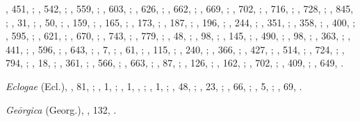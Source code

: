 \begin{autindex}
    , 451, ;
    , 542, ;
    , 559, ;
    , 603, ;
    , 626, ;
    , 662, ;
    , 669, ;
    , 702, ;
    , 716, ;
    , 728, ;
    , 845, ;
    ,  31, ;
    ,  50, ;
    , 159, ;
    , 165, ;
    , 173, ;
    , 187, ;
    , 196, ;
    , 244, ;
    , 351, ;
    , 358, ;
    , 400, ;
    , 595, ;
    , 621, ;
    , 670, ;
    , 743, ;
    , 779, ;
    ,  48, ;
    ,  98, ;
    , 145, ;
    , 490, ;
    ,  98, ;
    , 363, ;
    , 441, ;
    , 596, ;
    , 643, ;
    ,   7, ;
    ,  61, ;
    , 115, ;
    , 240, ;
    , 366, ;
    , 427, ;
    , 514, ;
    , 724, ;
    , 794, ;
    ,  18, ;
    , 361, ;
    , 566, ;
    , 663, ;
    ,  87, ;
    , 126, ;
    , 162, ;
    , 702, ;
    , 409, ;
    , 649, .

  \subitem \emph{Eclogae} (Ecl.),
    , 81, ;
    ,  1, ;
    ,  1, , ;
    ,  1, ;
    , 48, ;
    , 23, ;
    , 66, ;
    ,  5, ;
    , 69, .

  \subitem \emph{Geōrgica} (Georg.),
    , 132, .

\end{autindex}

\endinput
